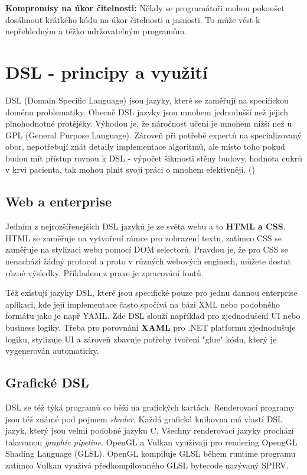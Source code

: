 \documentclass[male,czech]{kithesis}
\begin{document}
\textbf{Kompromisy na úkor čitelnosti:}
Někdy se programátoři mohou pokoušet dosáhnout krátkého kódu na úkor čitelnosti a jasnosti. 
To může vést k nepřehledným a těžko udržovatelným programům.

\chapter{DSL - principy a využití}
DSL (Domain Specific Language) jsou jazyky, které se zaměřují na specifickou doménu problematiky.
Obecně DSL jazyky jsou mnohem jednodušší než jejich plnohodnotné protějšky. Výhodou je, že 
náročnost učení je mnohem nižší než u GPL (General Purpose Language). Zároveň při potřebě 
expertů na specializovaný obor, nepotřebují znát detaily 
implementace algoritmů, ale místo toho pokud budou mít přístup rovnou k DSL - výpočet šikmosti stěny budovy,
hodnota cukrů v krvi pacienta, tak mohou plnit svojí práci o mnohem efektivněji. (\cite{DomainSpecificLanguages})

\section{Web a enterprise}
Jedním z nejrozšířenejších DSL jazyků je ze světa webu a to \textbf{HTML a CSS}. HTML se zaměřuje na vytvoření rámce pro zobrazení textu,
zatímco CSS se zaměřuje na stylizaci webu pomocí DOM selectorů. Pravdou je, že pro CSS se nenachází žádný 
protocol a proto v různých webových enginech, můžete dostat různé výsledky. Příkladem z praxe je zpracování
fontů.

Též existují jazyky DSL, které jsou specifické pouze pro jednu dannou enterprise aplikaci, kde její implementace
často spočívá na bázi XML nebo podobného formátu jako je např YAML. Zde DSL slouží například pro 
zjednodušení UI nebo business logiky. Třeba pro porovnání \textbf{XAML} pro .NET platformu zjednodušuje logiku, 
stylizuje UI a zároveň zbavuje potřeby tvoření "glue" kódu, který je vygenerován automaticky.

\section{Grafické DSL}
DSL se též týká programů co běží na grafických kartách. 
Renderovací programy jsou též známé pod pojmem \textit{shader}.
Každá grafická knihovna má vlastí DSL jazyk, který jsou velmi
podobné jazyku C. Všechny renderovací jazyky prochází takzvanou 
\textit{graphic pipeline}. OpenGL a Vulkan využívají pro rendering 
OpengGL Shading Language (GLSL). OpenGL kompiluje GLSL během runtime 
programu zatímco Vulkan využívá předkompilovaného GLSL bytecode nazývaný SPIRV.
\end{document}
